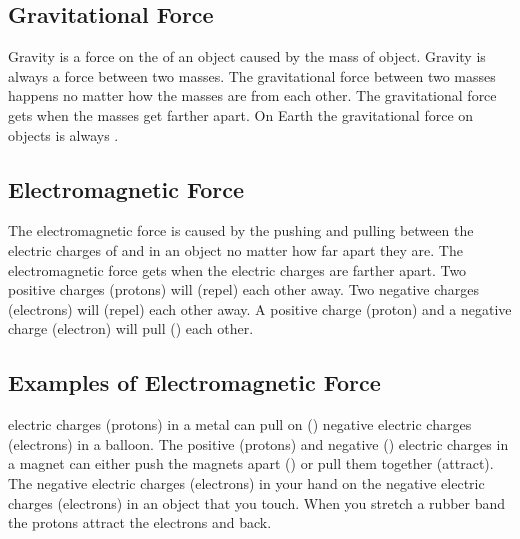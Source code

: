 \documentclass[answers,12pt]{exam}
\begin{document}
\begin{questions}
    

\subsection*{Gravitational Force}

\question Gravity is a force on the \fillin of an object caused by the mass of \fillin object.
\question Gravity is always a \fillin force between two masses.
\question The gravitational force between two masses happens no matter how \fillin the masses are from each other.
\question The gravitational force gets \fillin when the masses get farther apart.
\question On Earth the gravitational force on objects is always \fillin.

\subsection*{Electromagnetic Force}

\question The electromagnetic force is caused by the pushing and pulling between the electric charges of \fillin and \fillin in an object no matter how far apart they are.
\question The electromagnetic force gets \fillin when the electric charges are farther apart.
\question Two positive charges (protons) will \fillin (repel) each other away.
\question Two negative charges (electrons) will \fillin (repel) each other away.
\question A positive charge (proton) and a negative charge (electron) will pull (\fillin) each other.

\subsection*{Examples of Electromagnetic Force}

\question \fillin electric charges (protons) in a metal can pull on (\fillin) negative electric charges (electrons) in a balloon.
\question The positive (protons) and negative (\fillin) electric charges in a magnet can either push the magnets apart (\fillin) or pull them together (attract).
\question The negative electric charges (electrons) in your hand \fillin on the negative electric charges (electrons) in an object that you touch.
\question When you stretch a rubber band the protons attract the electrons and \fillin back.


\end{questions}
\end{document}
